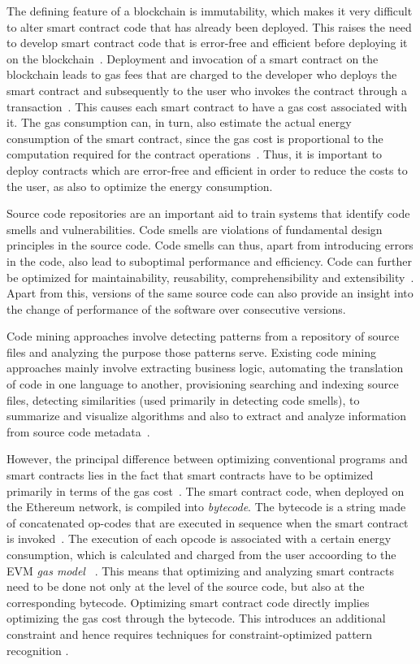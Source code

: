 \documentclass[10pt,conference]{IEEEtran}
\begin{document}
	The defining feature of a blockchain is immutability, which makes it very difficult to alter smart contract code that has already been deployed. This raises the need to develop smart contract code that is error-free and efficient before deploying it on the blockchain~\cite{brandstatter}. Deployment and invocation of a smart contract on the blockchain leads to gas fees that are charged to the developer who deploys the smart contract and subsequently to the user who invokes the contract through a transaction~\cite{ethpaper}. This causes each smart contract to have a gas cost associated with it. The gas consumption can, in turn, also estimate the actual energy consumption of the smart contract, since the gas cost is proportional to the computation required for the contract operations~\cite{contractenergyconsumptionthesis}. Thus, it is important to deploy contracts which are error-free and efficient in order to reduce the costs to the user, as also to optimize the energy consumption. 
	
	Source code repositories are an important aid to train systems that identify code smells and vulnerabilities. Code smells  are violations of fundamental design principles in the source code. Code smells can thus, apart from introducing errors in the code, also lead to suboptimal performance and efficiency. Code can further be optimized for maintainability, reusability, comprehensibility and extensibility~\cite{codesmellmining}. Apart from this, versions of the same source code can also provide an insight into the change of performance of the software over consecutive versions\cite{softwareversion}. 
	
	Code mining approaches involve detecting patterns from a repository of source files and analyzing the purpose those patterns serve. Existing code mining approaches mainly involve extracting business logic, automating the translation of code in one language to another, provisioning searching and indexing source files, detecting similarities (used primarily in detecting code smells), to summarize and visualize algorithms and also to extract and analyze information from source code metadata~\cite{codeminingsurvey}. 
	
	However, the principal difference between optimizing conventional programs and smart contracts lies in the fact that smart contracts have to be optimized primarily in terms of the gas cost~\cite{superoptimization}. The smart contract code, when deployed on the Ethereum network, is compiled into \textit{bytecode}. The bytecode is a string made of concatenated op-codes that are executed in sequence when the smart contract is invoked~\cite{wood2019ethereum}. The execution of each opcode is associated with a certain energy consumption, which is calculated and charged from the user accoording to the EVM \textit{gas model} ~\cite{wood2019ethereum}. This means that optimizing and analyzing smart contracts need to be done not only at the level of the source code, but also at the corresponding bytecode. Optimizing smart contract code directly implies optimizing the gas cost through the bytecode. This introduces an additional constraint and hence requires techniques for constraint-optimized pattern recognition \cite{utilitypattern}.
	
\end{document}
